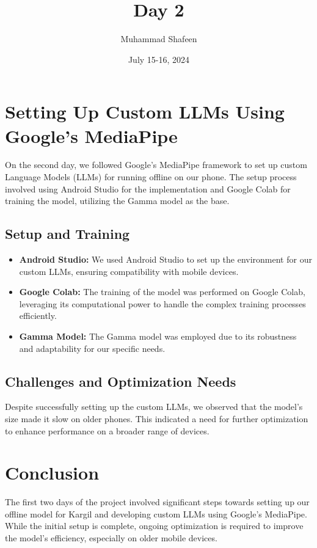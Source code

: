 \documentclass[12pt]{article}
\title{Day 2}
\author{Muhammad Shafeen}
\date{July 15-16, 2024}
\begin{document}
\maketitle

\section*{Setting Up Custom LLMs Using Google's MediaPipe}
On the second day, we followed Google's MediaPipe framework to set up custom Language Models (LLMs) for running offline on our phone. The setup process involved using Android Studio for the implementation and Google Colab for training the model, utilizing the Gamma model as the base.

\subsection*{Setup and Training}
\begin{itemize}
    \item \textbf{Android Studio:} We used Android Studio to set up the environment for our custom LLMs, ensuring compatibility with mobile devices.
    \item \textbf{Google Colab:} The training of the model was performed on Google Colab, leveraging its computational power to handle the complex training processes efficiently.
    \item \textbf{Gamma Model:} The Gamma model was employed due to its robustness and adaptability for our specific needs.
\end{itemize}

\subsection*{Challenges and Optimization Needs}
Despite successfully setting up the custom LLMs, we observed that the model's size made it slow on older phones. This indicated a need for further optimization to enhance performance on a broader range of devices.

\section*{Conclusion}
The first two days of the project involved significant steps towards setting up our offline model for Kargil and developing custom LLMs using Google's MediaPipe. While the initial setup is complete, ongoing optimization is required to improve the model's efficiency, especially on older mobile devices.
\end{document}
